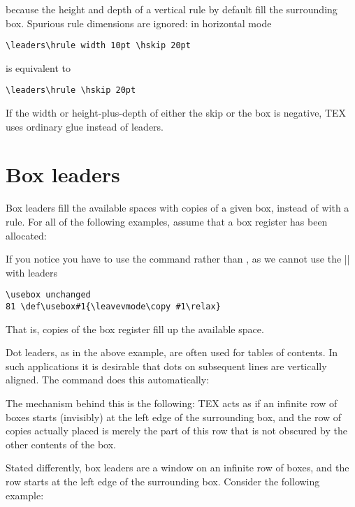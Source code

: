 because the height and depth of a vertical rule by default fill the surrounding box.
Spurious rule dimensions are ignored: in horizontal mode

\verb+\leaders\hrule width 10pt \hskip 20pt+

is equivalent to

\verb+\leaders\hrule \hskip 20pt+

If the width or height-plus-depth of either the skip or the box is negative, TEX uses ordinary glue
instead of leaders.

\section{Box leaders}
Box leaders fill the available spaces with copies of a given box, instead of with a rule. For all of the following examples, assume that a box register has been allocated:


If you notice you have to use the  command rather than , as we cannot use the |\leavevmode| with leaders

\begin{verbatim}
\usebox unchanged
81 \def\usebox#1{\leavevmode\copy #1\relax}
\end{verbatim}

That is, copies of the box register fill up the available space.

Dot leaders, as in the above example, are often used for tables of contents. In such applications it
is desirable that dots on subsequent lines are vertically aligned. The command does this
automatically:


The mechanism behind this is the following: TEX acts as if an infinite row of boxes starts (invisibly)
at the left edge of the surrounding box, and the row of copies actually placed is merely the part of
this row that is not obscured by the other contents of the box.

Stated differently, box leaders are a window on an infinite row of boxes, and the row starts at the
left edge of the surrounding box. Consider the following example:

